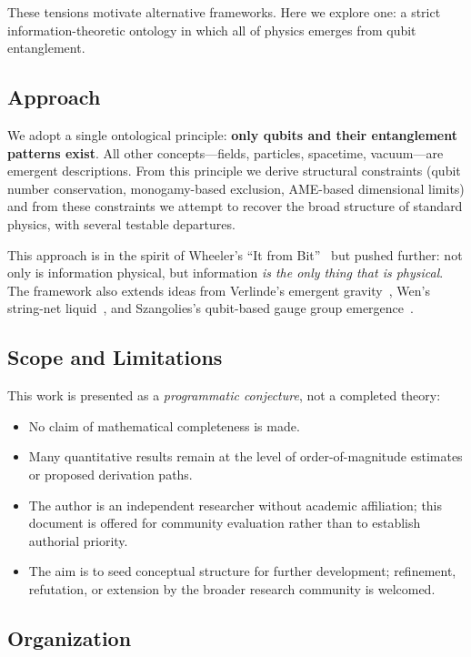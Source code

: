 \documentclass[11pt,a4paper]{article}
\begin{document}
These tensions motivate alternative frameworks. Here we explore one: a strict information-theoretic ontology in which all of physics emerges from qubit entanglement.

\subsection{Approach}

We adopt a single ontological principle: \textbf{only qubits and their entanglement patterns exist}. All other concepts---fields, particles, spacetime, vacuum---are emergent descriptions. From this principle we derive structural constraints (qubit number conservation, monogamy-based exclusion, AME-based dimensional limits) and from these constraints we attempt to recover the broad structure of standard physics, with several testable departures.

This approach is in the spirit of Wheeler's ``It from Bit''~\cite{Wheeler1990} but pushed further: not only is information physical, but information \emph{is the only thing that is physical}. The framework also extends ideas from Verlinde's emergent gravity~\cite{Verlinde2010,Verlinde2016}, Wen's string-net liquid~\cite{Wen2017}, and Szangolies's qubit-based gauge group emergence~\cite{Szangolies2025}.

\subsection{Scope and Limitations}

This work is presented as a \emph{programmatic conjecture}, not a completed theory:
\begin{itemize}[leftmargin=*]
\item No claim of mathematical completeness is made.
\item Many quantitative results remain at the level of order-of-magnitude estimates or proposed derivation paths.
\item The author is an independent researcher without academic affiliation; this document is offered for community evaluation rather than to establish authorial priority.
\item The aim is to seed conceptual structure for further development; refinement, refutation, or extension by the broader research community is welcomed.
\end{itemize}

\subsection{Organization}
\end{document}
